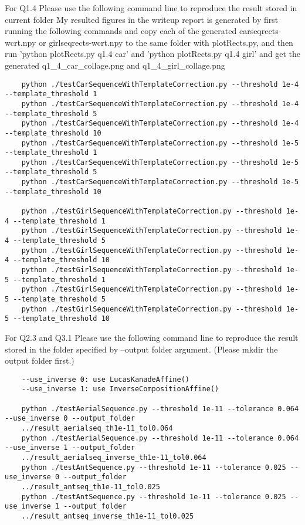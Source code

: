 \documentclass{article}
\begin{document}
	For Q1.4 Please use the following command line to reproduce the result stored in current folder
	My resulted figures in the writeup report is generated by first running the following commands and copy each of the generated carseqrects-wcrt.npy or 	girlseqrects-wcrt.npy to the same folder with plotRects.py, and then run 'python plotRects.py q1.4 car' and 'python plotRects.py q1.4 girl' and get the generated q1\_4\_car\_collage.png and q1\_4\_girl\_collage.png
	\begin{verbatim}
	python ./testCarSequenceWithTemplateCorrection.py --threshold 1e-4 --template_threshold 1
	python ./testCarSequenceWithTemplateCorrection.py --threshold 1e-4 --template_threshold 5
	python ./testCarSequenceWithTemplateCorrection.py --threshold 1e-4 --template_threshold 10
	python ./testCarSequenceWithTemplateCorrection.py --threshold 1e-5 --template_threshold 1
	python ./testCarSequenceWithTemplateCorrection.py --threshold 1e-5 --template_threshold 5
	python ./testCarSequenceWithTemplateCorrection.py --threshold 1e-5 --template_threshold 10

	python ./testGirlSequenceWithTemplateCorrection.py --threshold 1e-4 --template_threshold 1
	python ./testGirlSequenceWithTemplateCorrection.py --threshold 1e-4 --template_threshold 5
	python ./testGirlSequenceWithTemplateCorrection.py --threshold 1e-4 --template_threshold 10
	python ./testGirlSequenceWithTemplateCorrection.py --threshold 1e-5 --template_threshold 1
	python ./testGirlSequenceWithTemplateCorrection.py --threshold 1e-5 --template_threshold 5
	python ./testGirlSequenceWithTemplateCorrection.py --threshold 1e-5 --template_threshold 10
	\end{verbatim}

	For Q2.3 and Q3.1 Please use the following command line to reproduce the result stored in the folder specified by --output folder argument. (Please mkdir the output folder first.)
	\begin{verbatim}
	--use_inverse 0: use LucasKanadeAffine()
	--use_inverse 1: use InverseCompositionAffine()

	python ./testAerialSequence.py --threshold 1e-11 --tolerance 0.064 --use_inverse 0 --output_folder 
	../result_aerialseq_th1e-11_tol0.064
	python ./testAerialSequence.py --threshold 1e-11 --tolerance 0.064 --use_inverse 1 --output_folder 
	../result_aerialseq_inverse_th1e-11_tol0.064
	python ./testAntSequence.py --threshold 1e-11 --tolerance 0.025 --use_inverse 0 --output_folder 
	../result_antseq_th1e-11_tol0.025
	python ./testAntSequence.py --threshold 1e-11 --tolerance 0.025 --use_inverse 1 --output_folder 
	../result_antseq_inverse_th1e-11_tol0.025
	\end{verbatim}
	

	
\end{document}
